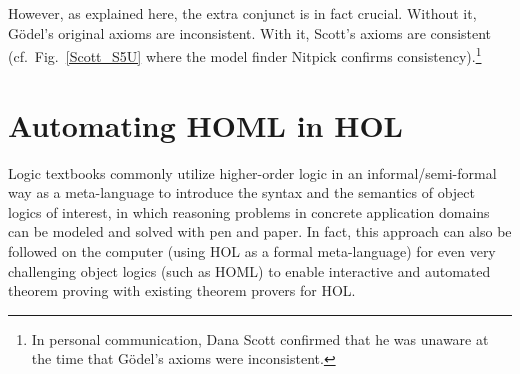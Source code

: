 \documentclass{article}
\begin{document}
However, as explained here, the extra conjunct is in
fact crucial. Without it, G\"odel's original axioms are
inconsistent. With it, Scott's axioms are consistent (cf.~Fig.~\ref{Scott_S5U}
where the model finder Nitpick \cite{Nitpick} confirms consistency).\footnote{In
  personal communication, Dana Scott confirmed that he was unaware
  at the time that G\"odel's axioms were inconsistent.}













\section{Automating HOML in HOL}\label{sec:homlinhol}

Logic textbooks %
commonly utilize higher-order logic in an informal/semi-formal way as
a meta-language to introduce the syntax and the semantics of object
logics of interest, in which reasoning problems in concrete
application domains can be modeled and solved with pen and paper. In
fact, this approach can also be followed on the computer (using HOL as
a formal meta-language) for even very challenging object logics (such
as HOML) to enable interactive and automated theorem proving with
existing theorem provers for HOL.
\end{document}

